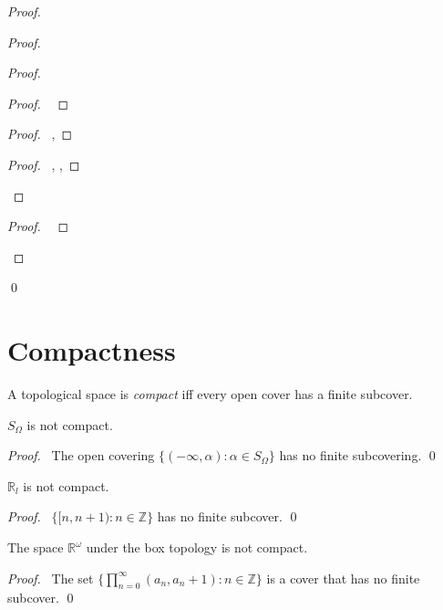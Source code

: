 \begin{proof}
\begin{proof}
\begin{proof}
\begin{proof}
      \pf\ 
    \end{proof}
    \begin{proof}
      \pf\ , 
    \end{proof}
    \begin{proof}
      \pf\ , , 
    \end{proof}
  \end{proof}
  \begin{proof}
    \pf\ 
  \end{proof}
\end{proof}
\qed
\end{proof}

\section{Compactness}

\begin{df}[Compact]
  A topological space is \emph{compact} iff every open cover has a finite
  subcover.
\end{df}

 \begin{prop}
   \label{prop:topology:compact:S_omega}
$S_\Omega$ is not compact.
\end{prop}

\begin{proof}
 \pf\ The open covering $\{ (- \infty, \alpha) : \alpha \in S_\Omega \}$ has
 no finite subcovering. \qed
\end{proof}

\begin{prop}
 $\mathbb{R}_l$ is not compact.
\end{prop}

\begin{proof}
 \pf\ $\{ [n, n+1) : n \in \mathbb{Z} \}$ has no finite subcover. \qed
\end{proof}

\begin{prop}
 The space $\mathbb{R}^\omega$ under the box topology is not compact.
\end{prop}

\begin{proof}
 \pf\ The set $\{ \prod_{n=0}^\infty (a_n, a_n+1) : n \in \mathbb{Z}
\}$ is a cover that has no finite subcover. \qed
\end{proof}

